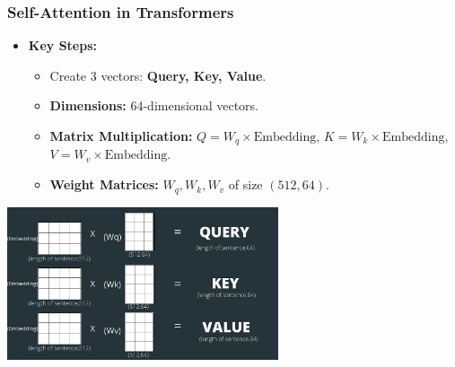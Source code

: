 \documentclass{beamer}
\begin{document}
\begin{frame}
  \frametitle{Self-Attention in Transformers}

  \begin{itemize}
    \item \textbf{Key Steps:}
      \begin{itemize}
        \item Create 3 vectors: \textbf{Query, Key, Value}.
        \item \textbf{Dimensions:} 64-dimensional vectors.
        \item \textbf{Matrix Multiplication:} $Q = W_q \times \text{Embedding}$, $K = W_k \times \text{Embedding}$, $V = W_v \times \text{Embedding}$.
        \item \textbf{Weight Matrices:} $W_q, W_k, W_v$ of size $(512, 64)$.
      \end{itemize}
  \end{itemize}

  \vspace{1cm}

  \begin{center}
    \includegraphics[width=0.6\textwidth]{QKV.png} %
  \end{center}

\end{frame}
\end{document}
